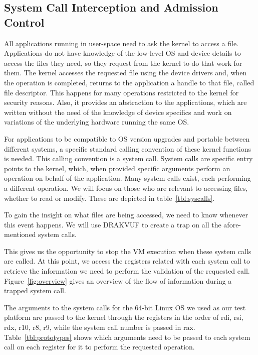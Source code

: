 \subsection{System Call Interception and Admission Control}\label{sub:syscalls}


\par All applications running in user-space need to ask the kernel to access a file. Applications do not have knowledge of the low-level \ac{OS} and device details to access the files they need, so they request from the kernel to do that work for them. The kernel accesses the requested file using the device drivers and, when the operation is completed, returns to the application a handle to that file, called file descriptor. This happens for many operations restricted to the kernel for security reasons. Also, it provides an abstraction to the applications, which are written without the need of the knowledge of device specifics and work on variations of the underlying hardware running the same \ac{OS}. 

\par For applications to be compatible to \ac{OS} version upgrades and portable between different systems, a specific standard calling convention of these kernel functions is needed. This calling convention is a system call. System calls are specific entry points to the kernel, which, when provided specific arguments perform an operation on behalf of the application. Many system calls exist, each performing a different operation. We will focus on those who are relevant to accessing files, whether to read or modify. These are depicted in table~\ref{tbl:syscalls}.

\par To gain the insight on what files are being accessed, we need to know whenever this event happens. We will use DRAKVUF to create a trap on all the afore-mentioned system calls.

\par This gives us the opportunity to stop the \ac{VM} execution when these system calls are called. At this point, we access the registers related with each system call to retrieve the information we need to perform the validation of the requested call. Figure~\ref{fig:overview} gives an overview of the flow of information during a trapped system call. 

\par The arguments to the system calls for the 64-bit Linux \ac{OS} we used as our test platform are passed to the kernel through the registers in the order of rdi, rsi, rdx, r10, r8, r9, while the system call number is passed in rax. Table~\ref{tbl:prototypes} shows which arguments need to be passed to each system call on each register for it to perform the requested operation.

